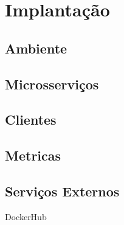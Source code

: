 \chapter{Implantação}
\label{cap6}

\section{Ambiente}

\section{Microsserviços}

\section{Clientes}

\section{Metricas}

\section{Serviços Externos}

DockerHub
